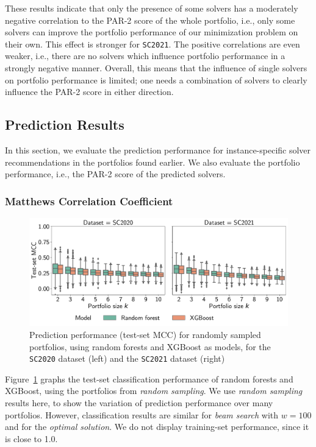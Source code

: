 \documentclass[a4paper,USenglish,pdfa]{lipics-v2021} %
\begin{document}
These results indicate that only the presence of some solvers has a moderately negative correlation to the PAR-2 score of the whole portfolio, i.e., only some solvers can improve the portfolio performance of our minimization problem on their own.
This effect is stronger for \texttt{SC2021}.
The positive correlations are even weaker, i.e., there are no solvers which influence portfolio performance in a strongly negative manner.
Overall, this means that the influence of single solvers on portfolio performance is limited; one needs a combination of solvers to clearly influence the PAR-2 score in either direction.

\subsection{Prediction Results}

In this section, we evaluate the prediction performance for instance-specific solver recommendations in the portfolios found earlier. 
We also evaluate the portfolio performance, i.e., the PAR-2 score of the predicted solvers.

\subsubsection{Matthews Correlation Coefficient}

\begin{figure}[htb]
	\centering
	\includegraphics[width=\columnwidth]{plots/prediction-test-mcc.pdf}
	\caption{
		Prediction performance (test-set MCC) for randomly sampled portfolios, using random forests and XGBoost as models, for the \texttt{SC2020} dataset (left) and the \texttt{SC2021} dataset (right)
	}
	\label{fig:prediction-test-mcc}
\end{figure}

Figure~\ref{fig:prediction-test-mcc} graphs the test-set classification performance of random forests and XGBoost, using the portfolios from \emph{random sampling}.
We use \emph{random sampling} results here, to show the variation of prediction performance over many portfolios.
However, classification results are similar for \emph{beam search} with $w=100$ and for the \emph{optimal solution}.
We do not display training-set performance, since it is close to 1.0.
\end{document}
